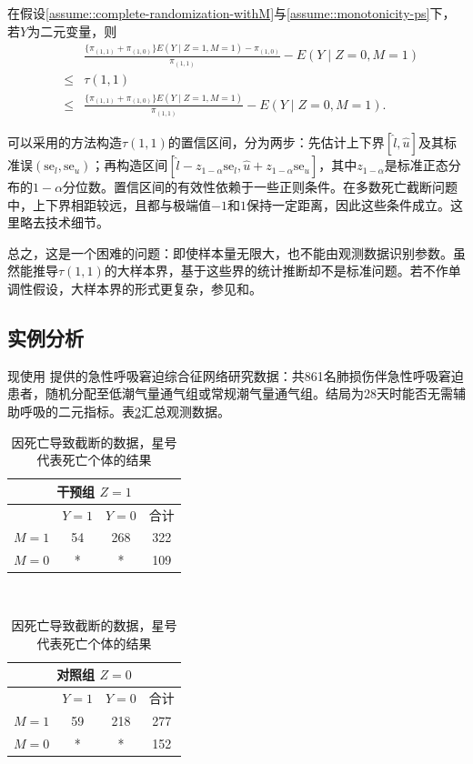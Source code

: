 \begin{theorem}
\label{thm::bounds-on-SACE-binary-Y}
在假设\ref{assume::complete-randomization-withM}与\ref{assume::monotonicity-ps}下，若$Y$为二元变量，则
\begin{eqnarray*}
&&\frac{  \{  \pi_{(1,1)} + \pi_{(1,0)} \} E(Y\mid Z=1,M=1) - \pi_{(1,0)}}{ \pi_{(1,1)}} - E(Y\mid Z=0, M=1) \\
&\leq & \tau(1,1) \\
& \leq &\frac{  \{  \pi_{(1,1)} + \pi_{(1,0)} \} E(Y\mid Z=1,M=1)  }{ \pi_{(1,1)}}  - E(Y\mid Z=0, M=1). 
\end{eqnarray*}
\end{theorem}




可以采用\citet{imbens2004confidence}的方法构造$\tau(1,1)$的置信区间，分为两步：先估计上下界$[\hat{l}, \hat{u}]$及其标准误$(\text{se}_l, \text{se}_u)$；再构造区间$[ \hat{l} - z_{1-\alpha}  \text{se}_l, \hat{u} + z_{1-\alpha}    \text{se}_u]$，其中$z_{1-\alpha} $是标准正态分布的$1-\alpha$分位数。\citet{imbens2004confidence}置信区间的有效性依赖于一些正则条件。在多数死亡截断问题中，上下界相距较远，且都与极端值$-1$和$1$保持一定距离，因此这些条件成立。这里略去技术细节。 



总之，这是一个困难的问题：即使样本量无限大，也不能由观测数据识别参数。虽然能推导$\tau(1,1)$的大样本界，基于这些界的统计推断却不是标准问题。若不作单调性假设，大样本界的形式更复杂，参见\citet{zhang2003estimation}和\citet[][Appendix A]{jiang2016principal}。 




\subsection{实例分析}\label{section::ps-application}


现使用 \citet{yang2016using} 提供的急性呼吸窘迫综合征网络研究数据：共861名肺损伤伴急性呼吸窘迫患者，随机分配至低潮气量通气组或常规潮气量通气组。结局为28天时能否无需辅助呼吸的二元指标。表\ref{tb::truncationbydeath}汇总观测数据。 


\begin{table} 
\centering 
\caption{因死亡导致截断的数据，星号代表死亡个体的结果}\label{tb::truncationbydeath}
\begin{tabular}{cccc}
\hline 
\multicolumn{4}{c}{ 干预组 $Z=1$ } \\
\hline 
 & $Y=1$ & $Y=0$ &  合计\\
$M=1$ &    54 & 268& 322 \\
$M=0$  & * & * & 109 \\
\hline 
\end{tabular}
~~~~~
\begin{tabular}{cccc}
\hline 
\multicolumn{4}{c}{ 对照组 $Z=0$ } \\
\hline 
 & $Y=1$ & $Y=0$ &合计 \\
$M=1$ &    59 & 218&  277 \\
$M=0$  & * & *& 152 \\
\hline 
\end{tabular}
\end{table}

